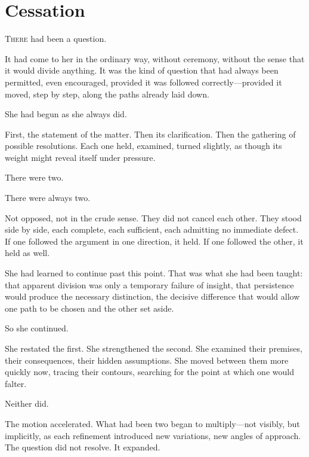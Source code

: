 
\chapter{Cessation}


\lettrine{T}{here} had been a question.

It had come to her in the ordinary way, without ceremony, without
the sense that it would divide anything. It was the kind of question
that had always been permitted, even encouraged, provided it was
followed correctly---provided it moved, step by step, along the
paths already laid down.

She had begun as she always did.

First, the statement of the matter. Then its clarification. Then
the gathering of possible resolutions. Each one held, examined,
turned slightly, as though its weight might reveal itself under
pressure.

There were two.

There were always two.

Not opposed, not in the crude sense. They did not cancel each
other. They stood side by side, each complete, each sufficient,
each admitting no immediate defect. If one followed the argument
in one direction, it held. If one followed the other, it held as
well.

She had learned to continue past this point. That was what she had
been taught: that apparent division was only a temporary failure of
insight, that persistence would produce the necessary distinction,
the decisive difference that would allow one path to be chosen and
the other set aside.

So she continued.

She restated the first. She strengthened the second. She examined
their premises, their consequences, their hidden assumptions. She
moved between them more quickly now, tracing their contours,
searching for the point at which one would falter.

Neither did.

The motion accelerated. What had been two began to multiply---not
visibly, but implicitly, as each refinement introduced new
variations, new angles of approach. The question did not resolve.
It expanded.

